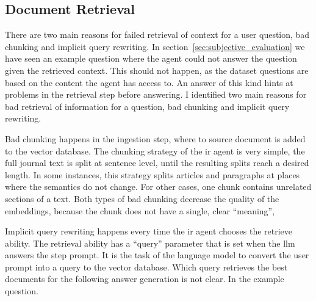 \documentclass[../main.tex]{subfiles}
\begin{document}
\subsection{Document Retrieval}

There are two main reasons for failed retrieval of context for a user question,
bad chunking and implicit query rewriting.
In section~\ref{sec:subjective_evaluation} we have seen an example question where
the agent could not answer the question given the retrieved context.
This should not happen, as the dataset questions are based on the content the agent has access to.
An answer of this kind hints at problems in the retrieval step before answering.
I identified two main reasons for bad retrieval of information for a question,
bad chunking and implicit query rewriting.



Bad chunking happens in the ingestion step, where to source document is added to the
vector database.
The chunking strategy of the \gls{ir} agent is very simple, the full journal text
is split at sentence level, until the resulting splits reach a desired length.
In some instances, this strategy splits articles and paragraphs at places
where the semantics do not change.
For other cases, one chunk contains unrelated sections of a text.
Both types of bad chunking decrease the quality of the embeddings, because the
chunk does not have a single, clear ``meaning'',

Implicit query rewriting happens every time the \gls{ir} agent chooses the retrieve ability.
The retrieval ability has a ``query'' parameter that is set when the \gls{llm}
answers the step prompt.
It is the task of the language model to convert the user prompt into a query
to the vector database.
Which query retrieves the best documents for the following answer generation is not clear.
In the example question.
\end{document}
